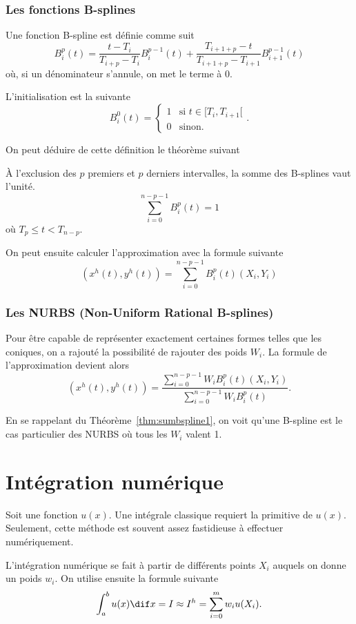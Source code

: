 \section{Les fonctions B-splines}
Une fonction B-spline est définie comme suit
\[ B_i^p(t) = \frac{t-T_i}{T_{i+p}-T_i} B_i^{p-1}(t)
+ \frac{T_{i+1+p} - t}{T_{i+1+p} - T_{i+1}}B_{i+1}^{p-1}(t) \]
où, si un dénominateur s'annule, on met le terme à 0.

L'initialisation est la suivante
\[ B_i^0(t) = \left\{\begin{array}{ll}
1 & \text{si }t \in [T_i, T_{i+1}[\\
0 & \text{sinon.}\end{array}\right.. \]

On peut déduire de cette définition le théorème suivant
\begin{mytheo}
  \label{thm:sumbspline1}
  À l'exclusion des $p$ premiers et $p$ derniers intervalles,
  la somme des B-splines vaut l'unité.
  \[ \sum_{i=0}^{n-p-1} B_i^p(t) = 1 \]
  où $T_p \leq t < T_{n-p}$.
\end{mytheo}

On peut ensuite calculer l'approximation avec la formule suivante
\[ (x^h(t), y^h(t)) = \sum_{i=0}^{n-p-1} B_i^p(t) (X_i, Y_i) \]

\section{Les NURBS (Non-Uniform Rational B-splines)}
Pour être capable de représenter exactement certaines formes telles
que les coniques, on a rajouté la possibilité de rajouter des poids $W_i$.
La formule de l'approximation devient alors
\[ (x^h(t), y^h(t)) =
\frac{\sum_{i=0}^{n-p-1}W_iB_i^p(t)(X_i, Y_i)}
{\sum_{i=0}^{n-p-1}W_iB_i^p(t)}. \]

En se rappelant du Théorème~\ref{thm:sumbspline1}, on voit
qu'une B-spline est le cas particulier des NURBS où tous les $W_i$ valent 1.

\part{Intégration numérique}
Soit une fonction $u(x)$.
Une intégrale classique requiert la primitive de $u(x)$.
Seulement, cette méthode est souvent assez fastidieuse à effectuer
numériquement.

L'intégration numérique se fait à partir de différents points $X_i$ auquels
on donne un poids $w_i$. On utilise ensuite la formule suivante 
\[ \int_a^b u(x) \dif x = I \approx I^h = \sum_{i=0}^m w_i u(X_i). \]

